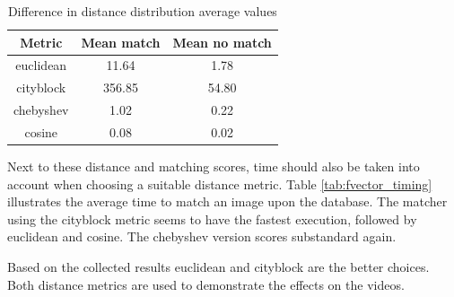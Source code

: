 \renewcommand{\arraystretch}{1.2}
\begin{table}[htbp]
    \caption{Difference in distance distribution average values}
    \centering
    \begin{center}
        \begin{tabular}{ |c|c|c| }
         \hline
         Metric& Mean match & Mean no match\\
         \hline \hline
         euclidean  & 11.64 & 1.78\\
         \hline
         cityblock & 356.85 & 54.80\\
         \hline
         chebyshev & 1.02 & 0.22\\
         \hline
         cosine & 0.08 & 0.02 \\
         \hline
        \end{tabular}
    \end{center}
    \label{tab:fvector_difference_mean}
\end{table}




Next to these distance and matching scores, time should also be taken into account when choosing a suitable distance metric. Table \ref{tab:fvector_timing} illustrates the average time to match an image upon the database. The matcher using the cityblock metric seems to have the fastest execution, followed by euclidean and cosine. The chebyshev version scores substandard again.

Based on the collected results euclidean and cityblock are the better choices. Both distance metrics are used to demonstrate the effects on the videos.

